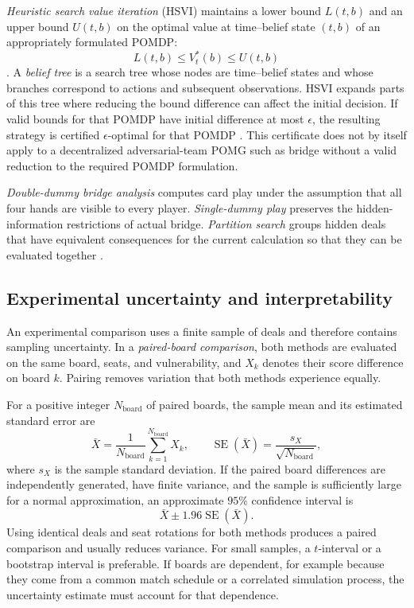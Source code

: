 \emph{Heuristic search value iteration} (HSVI) maintains a lower bound $L(t,b)$ and an upper bound $U(t,b)$ on the optimal value at time--belief state $(t,b)$ of an appropriately formulated POMDP:
\[
    L(t,b)\leq V_t^\ast(b)\leq U(t,b)
\].
A \emph{belief tree} is a search tree whose nodes are time--belief states and whose branches correspond to actions and subsequent observations. HSVI expands parts of this tree where reducing the bound difference can affect the initial decision. If valid bounds for that POMDP have initial difference at most $\epsilon$, the resulting strategy is certified $\epsilon$-optimal for that POMDP \cite{delage2024hsvi}. This certificate does not by itself apply to a decentralized adversarial-team POMG such as bridge without a valid reduction to the required POMDP formulation.

\emph{Double-dummy bridge analysis} computes card play under the assumption that all four hands are visible to every player. \emph{Single-dummy play} preserves the hidden-information restrictions of actual bridge. \emph{Partition search} groups hidden deals that have equivalent consequences for the current calculation so that they can be evaluated together \cite{frank1998search,ginsberg2001gib}.


\subsection{Experimental uncertainty and interpretability}

An experimental comparison uses a finite sample of deals and therefore contains sampling uncertainty. In a \emph{paired-board comparison}, both methods are evaluated on the same board, seats, and vulnerability, and $X_k$ denotes their score difference on board $k$. Pairing removes variation that both methods experience equally.

For a positive integer $N_{\mathrm{board}}$ of paired boards, the sample mean and its estimated standard error are
\[
    \bar X
    =
    \frac{1}{N_{\mathrm{board}}}\sum_{k=1}^{N_{\mathrm{board}}} X_k,
    \qquad
    \operatorname{SE}(\bar X)
    =
    \frac{s_X}{\sqrt{N_{\mathrm{board}}}},
\]
where $s_X$ is the sample standard deviation. If the paired board differences are independently generated, have finite variance, and the sample is sufficiently large for a normal approximation, an approximate $95\%$ confidence interval is
\[
    \bar X\pm1.96\operatorname{SE}(\bar X).
\]
Using identical deals and seat rotations for both methods produces a paired comparison and usually reduces variance. For small samples, a $t$-interval or a bootstrap interval is preferable. If boards are dependent, for example because they come from a common match schedule or a correlated simulation process, the uncertainty estimate must account for that dependence.

